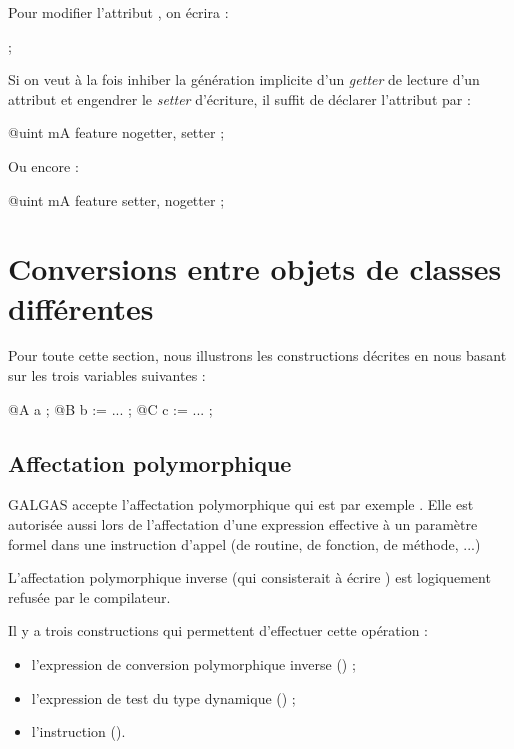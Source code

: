 Pour modifier l'attribut , on écrira :

\begin{galgascode}
[!?b setMA !12] ;
\end{galgascode}

Si on veut à la fois inhiber la génération implicite d'un \emph{getter} de lecture d'un attribut et engendrer le \emph{setter} d'écriture, il suffit de déclarer l'attribut par :

\begin{galgascode}
  @uint mA feature nogetter, setter ;
\end{galgascode}

Ou encore :

\begin{galgascode}
  @uint mA feature setter, nogetter ;
\end{galgascode}












\section{Conversions entre objets de classes différentes}

Pour toute cette section, nous illustrons les constructions décrites en nous basant sur les trois variables suivantes :

\begin{galgascode}
@A a ;
@B b := ... ;
@C c := ... ;
\end{galgascode}

\subsection{Affectation polymorphique}

GALGAS accepte l'affectation polymorphique qui est par exemple . Elle est autorisée aussi lors de l'affectation d'une expression effective à un paramètre formel dans une instruction d'appel (de routine, de fonction, de méthode, ...)

L'affectation polymorphique inverse (qui consisterait à écrire ) est logiquement refusée par le compilateur.

Il y a trois constructions qui permettent d'effectuer cette opération :
\begin{itemize}
  \item l'expression de conversion polymorphique inverse () ;
  \item l'expression de test du type dynamique () ;
  \item l'instruction  ().
\end{itemize}

